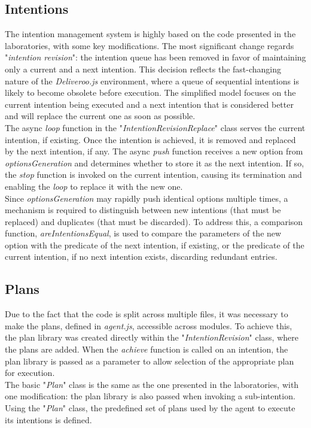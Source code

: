     \subsection{Intentions}
        The intention management system is highly based on the code presented in the laboratories, with some key modifications. The most significant change regards "\textit{intention revision}": the intention queue has been removed in favor of maintaining only a current and a next intention. This decision reflects the fast-changing nature of the \textit{Deliveroo.js} environment, where a queue of sequential intentions is likely to become obsolete before execution. The simplified model focuses on the current intention being executed and a next intention that is considered better and will replace the current one as soon as possible.
        \medskip\\
        The async \textit{loop} function in the "\textit{IntentionRevisionReplace}" class serves the current intention, if existing. Once the intention is achieved, it is removed and replaced by the next intention, if any. The async \textit{push} function receives a new option from \textit{optionsGeneration} and determines whether to store it as the next intention. If so, the \textit{stop} function is invoked on the current intention, causing its termination and enabling the \textit{loop} to replace it with the new one.
        \medskip\\
        Since \textit{optionsGeneration} may rapidly push identical options multiple times, a mechanism is required to distinguish between new intentions (that must be replaced) and duplicates (that must be discarded). To address this, a comparison function, \textit{areIntentionsEqual}, is used to compare the parameters of the new option with the predicate of the next intention, if existing, or the predicate of the current intention, if no next intention exists, discarding redundant entries.

    \subsection{Plans}
        Due to the fact that the code is split across multiple files, it was necessary to make the plans, defined in \textit{agent.js}, accessible across modules. To achieve this, the plan library was created directly within the "\textit{IntentionRevision}" class, where the plans are added. When the \textit{achieve} function is called on an intention, the plan library is passed as a parameter to allow selection of the appropriate plan for execution.
        \medskip\\
        The basic "\textit{Plan}" class is the same as the one presented in the laboratories, with one modification: the plan library is also passed when invoking a sub-intention.
        \medskip\\
        Using the "\textit{Plan}" class, the predefined set of plans used by the agent to execute its intentions is defined.

